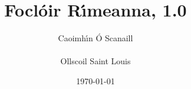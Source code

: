 \documentclass[10pt]{book}
\begin{document}
\begin{frontmatter}
\title{\Huge\bf Focl\'oir R\'{\i}meanna, 1.0} %
\author{{\Large Caoimh\'{\i}n \'O Scanaill}\\ \\ {\Large Ollscoil Saint Louis}}
\date{\today}
\maketitle
\doclicenseThis
\end{frontmatter}

\begin{mainmatter}
\begin{enumerate}[label=\textbf{\arabic*}]

\end{enumerate}
\end{mainmatter}
\end{document}
